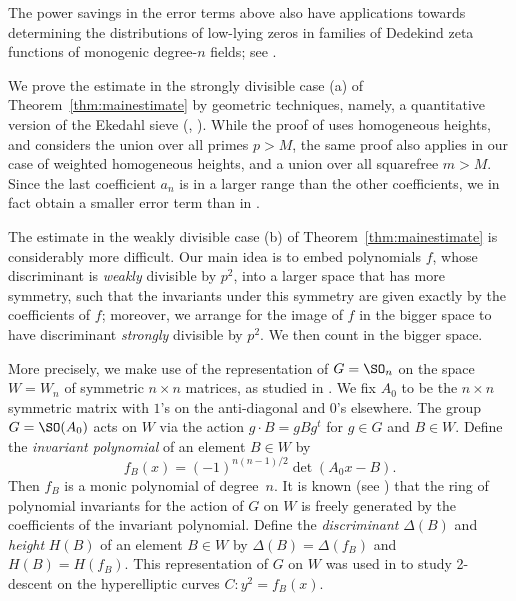 The power savings in the error terms above also have applications towards
determining the distributions of low-lying zeros in families of
Dedekind zeta functions of monogenic degree-$n$ fields; see \cite[\S5.2]{SST}.

We prove the estimate in the strongly divisible case (a) of
Theorem~\ref{thm:mainestimate} by geometric techniques, namely, a
quantitative version of the Ekedahl sieve (\cite{Ek}, \cite[Theorem
  3.3]{geosieve}). While the proof of \cite[Theorem~3.3]{geosieve}
uses homogeneous heights, and considers the union over all primes
$p>M$, the same proof also applies in our case of weighted homogeneous
heights, and a union over all squarefree $m>M$. Since the last
coefficient $a_n$ is in a larger range than the other coefficients, we
in fact obtain a smaller error term than in \cite[Theorem~3.3]{geosieve}.

The estimate in the weakly divisible case (b) of
Theorem~\ref{thm:mainestimate} is considerably more difficult. Our
main idea is to embed polynomials $f$, whose discriminant is {\it weakly}
divisible by $p^2$, into a larger space that has more symmetry, such
that the invariants under this symmetry are given exactly by the
coefficients of $f$; moreover, we arrange for the image of $f$ in the
bigger space to have discriminant {\it strongly} divisible by $p^2$.  We
then count in the bigger space.

More precisely, we make use of the representation of $G=\SO_n$ on the
space $W=W_n$ of symmetric $n\times n$ matrices, as studied in
\cite{BG2,SW}. We fix $A_0$ to be the $n\times n$ symmetric matrix
with $1$'s on the anti-diagonal and $0$'s elsewhere. The group
$G=\SO(A_0)$ acts on $W$ via the action $g\cdot B=gBg^t$ for $g\in G$
and $B\in W$.  Define the {\it invariant polynomial} of an element
$B\in W$ by $$f_B(x) = (-1)^{n(n-1)/2}\det(A_0x - B).$$ Then $f_B$ is
a monic polynomial of degree~$n$. It is known (see \cite[\S 4]{AITBG})
that the ring of polynomial invariants for the action of $G$ on $W$ is
freely generated by the coefficients of the invariant
polynomial. Define the {\it discriminant} $\Delta(B)$ and {\it height}
$H(B)$ of an element $B\in W$ by $\Delta(B)=\Delta(f_B)$ and
$H(B)=H(f_B)$.  This representation of $G$ on $W$ was used in
\cite{BG2,SW} to study 2-descent on the hyperelliptic curves
$C:y^2=f_B(x)$.


